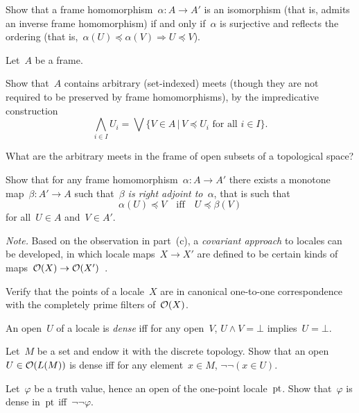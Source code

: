 \documentclass{ws-rv9x6}
\begin{document}
{\begin{exercise}%
\label{ex:isomorphisms-of-frames}%
Show that a frame homomorphism~$\alpha : A \to A'$ is an isomorphism (that is,
admits an inverse frame homomorphism) if and only if~$\alpha$ is surjective and
reflects the ordering (that is,~$\alpha(U) \preceq \alpha(V) \Rightarrow U
\preceq V$).
\end{exercise}

\begin{exercise}%
Let~$A$ be a frame.
\begin{alphlist}[(c)]
\item Show that~$A$ contains arbitrary (set-indexed) meets (though they are not
required to be preserved by frame homomorphisms), by the impredicative
construction
\[ \bigwedge_{i \in I} U_i = \bigvee\{ V \in A \,|\, \text{$V \preceq U_i$ for all~$i \in I$}
\}. \]
\item What are the arbitrary meets in the frame of open subsets of a
topological space?
\item Show that for any frame homomorphism~$\alpha : A \to A'$ there exists a
monotone map~$\beta : A' \to A$ such that~\emph{$\beta$ is right adjoint
to~$\alpha$}, that is such that
\[ \alpha(U) \preceq V \quad\text{iff}\quad U \preceq \beta(V) \]
for all~$U \in A$ and~$V \in A'$.
\end{alphlist}
{\scriptsize\emph{Note.} Based on the observation in part~(c), a
\emph{covariant approach} to locales can be developed, in which locale maps~$X
\to X'$ are defined to be certain kinds of maps~$\mathcal{O}(X) \to
\mathcal{O}(X')$~\cite{picado-pultr:covariant}.\par}
\end{exercise}

\begin{exercise}%
\label{ex:points-as-filters}%
Verify that the points of a locale~$X$ are in canonical one-to-one correspondence
with the completely prime filters of~$\mathcal{O}(X)$.
\end{exercise}

\begin{exercise}%
\label{ex:dense-opens}%
An open~$U$ of a locale is \emph{dense} iff for any open~$V$, $U \wedge V =
\bot$ implies~$U = \bot$.
\begin{alphlist}[(b)]
\item Let~$M$ be a set and endow it with the discrete topology. Show that an
open~$U \in \mathcal{O}(L(M))$ is dense iff for any element~$x \in M$, $\neg\neg(x \in
U)$.
\item Let~$\varphi$ be a truth value, hence an open of the one-point
locale~$\mathrm{pt}$. Show that~$\varphi$ is dense in~$\mathrm{pt}$ iff~$\neg\neg\varphi$.
\end{alphlist}
\end{exercise}

}
\end{document}
